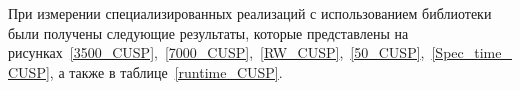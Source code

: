 При измерении специализированных реализаций с использованием библиотеки  были получены следующие результаты, которые представлены на рисунках~\ref{3500_CUSP},~\ref{7000_CUSP},~\ref{RW_CUSP},~\ref{50_CUSP},~\ref{Spec_time_CUSP}, а также в таблице~\ref{runtime_CUSP}.
%
